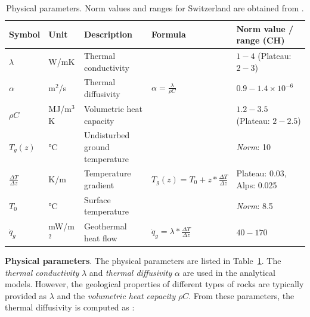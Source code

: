 \begin{table}[b]
\footnotesize
\caption{Physical parameters. Norm values and ranges for Switzerland are obtained from \citep{sia_sondes_2010}.}
\label{tab:phys_params}

\centering
\begin{tabular}{lllll}
\hline
\textbf{Symbol}             & \textbf{Unit} & \textbf{Description}           & \textbf{Formula}                                      & \textbf{Norm value / range (CH)} \\ \hline
$\lambda$                   & W/mK        & Thermal conductivity           &                                                       & $1-4$ (Plateau: $2-3$)           \\
$\alpha$                    & m$^2$/s       & Thermal diffusivity            & $\alpha = \frac{\lambda}{\rho C}$                     & $0.9-1.4 \times 10^{-6}$         \\
$\rho C$                    & MJ/m$^3$K      & Volumetric heat capacity       &                                                       & $1.2-3.5$ (Plateau: $2-2.5$)     \\ \hline
$T_g(z)$                    & °C    & Undisturbed ground temperature &                                                       & \textit{Norm}: 10                         \\
$\frac{\Delta T}{\Delta z}$ & K/m         & Temperature gradient           & $T_g(z) = T_0 + z * \frac{\Delta T}{\Delta z} $       & Plateau: 0.03, Alps: 0.025       \\
$T_0$                       & °C    & Surface temperature            &                                                       & \textit{Norm}: 8.5                        \\ \hline
$\dot{q}_{g}$               & mW/m$^2$      & Geothermal heat flow           & $\dot{q}_{g} = \lambda * \frac{\Delta T}{\Delta z}$   & $40-170$                         \\ \hline
\end{tabular}
\end{table}

\textbf{Physical parameters}. The physical parameters are listed in Table~\ref{tab:phys_params}. The \textit{thermal conductivity} $\lambda$ and \textit{thermal diffusivity} $\alpha$ are used in the analytical models. However, the geological properties of different types of rocks are typically provided as $\lambda$ and the \textit{volumetric heat capacity} $\rho C$. From these parameters, the thermal diffusivity is computed as \cite{pahud_geothermal_2002}:

